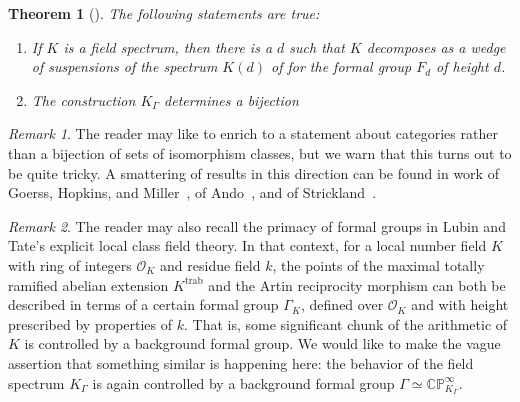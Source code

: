 \documentclass{amsart}
\newcommand{\C}{\mathbb{C}}
\newcommand{\CP}{\C\P}
\renewcommand{\P}{\mathbb{P}}
\newcommand{\<}{\langle}
\renewcommand{\>}{\rangle}
\newcommand{\sheaf}[1]{\mathcal{#1}}
\theoremstyle{plain}
\newtheorem*{theorem}{Theorem}
\theoremstyle{definition}
\theoremstyle{remark}
\newtheorem*{remark}{Remark}
\begin{document}
\begin{theorem}[{\cite[Proposition 1.9]{HopkinsSmith}}]\label{AnalysisOfFieldSpectra}
The following statements are true:
\begin{enumerate}
\item If $K$ is a field spectrum, then there is a $d$ such that $K$ decomposes as a wedge of suspensions of the spectrum $K(d)$ of  for the formal group $F_d$ of height $d$.
\item The construction $K_\Gamma$ determines a bijection
\begin{center}
\end{center}
\end{enumerate}
\end{theorem}

\begin{remark}
The reader may like to enrich  to a statement about categories rather than a bijection of sets of isomorphism classes, but we warn that this turns out to be quite tricky.  A smattering of results in this direction can be found in work of Goerss, Hopkins, and Miller~\cite[Corollary 7.6]{GoerssHopkins}, of Ando~\cite[Theorems 1 and 5]{Ando}, and of Strickland~\cite{StricklandEthyOfBSigma}.
\end{remark}

\begin{remark}
The reader may also recall the primacy of formal groups in Lubin and Tate's explicit local class field theory.  In that context, for a local number field $K$ with ring of integers $\sheaf O_K$ and residue field $k$, the points of the maximal totally ramified abelian extension $K^{\text{trab}}$ and the Artin reciprocity morphism can both be described in terms of a certain formal group $\Gamma_K$, defined over $\sheaf O_K$ and with height prescribed by properties of $k$.  That is, some significant chunk of the arithmetic of $K$ is controlled by a background formal group.  We would like to make the vague assertion that something similar is happening here: the behavior of the field spectrum $K_\Gamma$ is again controlled by a background formal group $\Gamma \simeq \CP^\infty_{K_\Gamma}$.
\end{remark}
\end{document}
